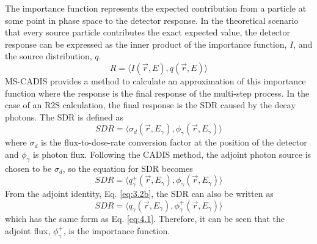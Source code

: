 The importance function represents the expected contribution from a particle 
at some point in phase space to the detector response.
In the theoretical scenario that every source particle contributes the exact 
expected value, the detector response can be
expressed as the inner product of the importance function, $I$, and the source
distribution, $q$.
\begin{equation} \label{eq:4.1}
R = %
    \langle I(\overrightarrow{r}, E), 
    q(\overrightarrow{r}, E) \rangle
\end{equation}
MS-CADIS provides a method to calculate an
 approximation 
of this importance function
where the response is the final response of the multi-step process.  In the case
of an R2S calculation, the final response is the SDR caused by the decay
photons.  The SDR is defined as 
\begin{equation} \label{eq:4.2}
  SDR =  \langle \sigma_{d}(\overrightarrow{r},E_{\gamma}),
  \phi_{\gamma}(\overrightarrow{r}, E_{\gamma}) \rangle
\end{equation}
where $\sigma_{d}$ is the flux-to-dose-rate conversion factor at the position of
the detector and $\phi_{\gamma}$ is photon flux.
Following the CADIS method, the adjoint photon source is chosen to be $\sigma_d$,
so the equation for SDR becomes 
\begin{equation} \label{eq:4.2.1}
	SDR =  \langle q_{\gamma}^{+}(\overrightarrow{r},E_{\gamma}),
                       \phi_{\gamma}(\overrightarrow{r}, E_{\gamma}) \rangle 
\end{equation}
From the adjoint identity, Eq. \ref{eq:3.2b}, the SDR can also be written as 
\begin{equation} \label{eq:4.3}
	SDR =
	\langle q_{\gamma}(\overrightarrow{r},E_{\gamma}),
  \phi_{\gamma}^{+}(\overrightarrow{r}, E_{\gamma}) \rangle 
\end{equation}
which has the same form as Eq. \ref{eq:4.1}.  Therefore, it can be seen that 
the adjoint flux, $\phi_{\gamma}^+$, is the importance function.

